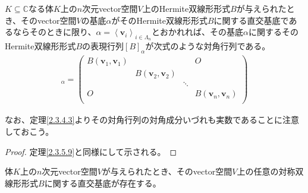 \documentclass[dvipdfmx]{jsarticle}
\begin{document}
\begin{thm}\label{2.3.5.10}
$K \subseteq \mathbb{C}$なる体$K$上の$n$次元vector空間$V$上のHermite双線形形式$B$が与えられたとき、そのvector空間$V$の基底$\alpha$がそのHermite双線形形式$B$に関する直交基底であるならそのときに限り、$\alpha = \left\langle \mathbf{v}_{i} \right\rangle_{i \in \varLambda_{n}}$とおかれれば、その基底$\alpha$に関するそのHermite双線形形式$B$の表現行列$[ B]_{\alpha}$が次式のような対角行列である。
\begin{align*}
[ B]_{\alpha} = \begin{pmatrix}
B\left( \mathbf{v}_{1},\mathbf{v}_{1} \right) & \  & \  & O \\
\  & B\left( \mathbf{v}_{2},\mathbf{v}_{2} \right) & \  & \  \\
\  & \  & \ddots & \  \\
O & \  & \  & B\left( \mathbf{v}_{n},\mathbf{v}_{n} \right) \\
\end{pmatrix}
\end{align*}
\end{thm}\par
なお、定理\ref{2.3.4.3}よりその対角行列の対角成分いづれも実数であることに注意しておこう。
\begin{proof} 定理\ref{2.3.5.9}と同様にして示される。
\end{proof}
\begin{thm}\label{2.3.5.11}
体$K$上の$n$次元vector空間$V$が与えられたとき、そのvector空間$V$上の任意の対称双線形形式$B$に関する直交基底が存在する。
\end{thm}
\end{document}
